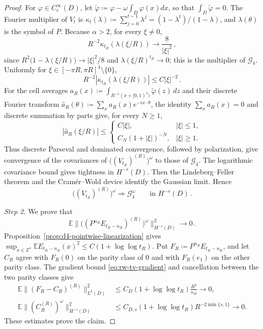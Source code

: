\documentclass[11pt]{amsart}
\theoremstyle{plain}
\theoremstyle{definition}
\newcommand{\Z}{\mathbb{Z}}
\newcommand{\E}{\mathbb{E}}
\begin{document}
\begin{proof}
			For $\varphi\in C_c^\infty(D)$, let $\widetilde\varphi\coloneqq\varphi-\omega\int_D\varphi(x)dx$, so that $\int_D\widetilde\varphi=0$. The Fourier multiplier of $V_t$ is $\kappa_t(\lambda)\coloneqq\sum_{j=0}^{t-1}\lambda^j=(1-\lambda^t)/(1-\lambda)$, and $\lambda(\theta)$ is the symbol of $P$. Because $\alpha>2$, for every $\xi\neq0$,
			\[
				R^{-2}\kappa_{t_R}(\lambda(\xi/R))\longrightarrow\frac8{|\xi|^2}\, ,
			\]
			since $R^2\bigl(1-\lambda(\xi/R)\bigr)\to|\xi|^2/8$ and $\lambda(\xi/R)^{t_R}\to0$; this is the multiplier of $\mathcal G_4$.
			Uniformly for $\xi\in[-\pi R,\pi R]^4\setminus\{0\}$,
			\[
				R^{-2}\left|\kappa_{t_R}(\lambda(\xi/R))\right|\leq C|\xi|^{-2}\, .
			\]
			For the cell averages
			$a_R(x)\coloneqq\int_{R^{-1}(x+[0,1)^4)}\widetilde\varphi(z)\,dz$ and their discrete Fourier transform
			$\widehat a_R(\theta)\coloneqq\sum_xa_R(x)e^{-ix\cdot\theta}$, the identity $\sum_xa_R(x)=0$ and discrete summation by parts give, for every $N\geq1$,
			\[
				\left|\widehat a_R(\xi/R)\right|\leq
				\begin{cases}
					C|\xi|,&|\xi|\leq1,\\
					C_N(1+|\xi|)^{-N},&|\xi|\geq1.
				\end{cases}
			\]
			Thus discrete Parseval and dominated convergence, followed by polarization, give convergence of the covariances of $\bigl((V_{t_R})^{(R)}\bigr)^\omega$ to those of $\mathcal G_4$.
			The logarithmic covariance bound gives tightness in $H^{-s}(D)$. Then the Lindeberg--Feller theorem and the Cram\'er--Wold device identify the Gaussian limit. Hence
			\begin{equation}\label{eq:d4-superdiffusive-linear-limit}
				\bigl((V_{t_R})^{(R)}\bigr)^\omega\Longrightarrow\mathcal G_4^\omega\qquad\text{in }H^{-s}(D)\, .
			\end{equation}

			\smallskip
			\noindent\emph{Step 2.} We prove that
			\[
				\E\bigl\|\bigl((P^{n_R}E_{t_R-n_R})^{(R)}\bigr)^\omega\bigr\|_{H^{-s}(D)}^2\longrightarrow0\, .
			\]
			Proposition~\ref{prop:d4-pointwise-linearization} gives $\sup_{x\in\Z^4}\E E_{t_R-n_R}(x)^2\leq C(1+\log\log t_R)$.
			Put $F_R\coloneqq P^{n_R}E_{t_R-n_R}$, and let $C_R$ agree with $F_R(0)$ on the parity class of $0$ and with $F_R(e_1)$ on the other parity class. The gradient bound \eqref{eq:rw-tv-gradient} and cancellation between the two parity classes give
			\begin{align*}
				\E\|(F_R-C_R)^{(R)}\|_{L^2(D)}^2
				&\leq C_D(1+\log\log t_R)\frac{R^2}{n_R}\longrightarrow0,\\
				\E\|(C_R^{(R)})^\omega\|_{H^{-s}(D)}^2
				&\leq C_{D,s}(1+\log\log t_R)R^{-2\min\{s,1\}}\longrightarrow0.
			\end{align*}
			These estimates prove the claim.


\end{proof}
\end{document}
